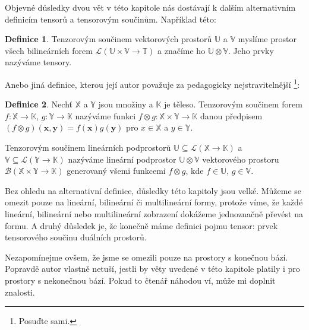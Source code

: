 \documentclass[a5paper,12pt]{amsbook}
\theoremstyle{definition}
\newtheorem{definition}{Definice}[chapter]
\newcommand{\myvec}[1]{\mathbf{#1}}
\newcommand{\myspace}[1]{\mathbb{#1}}
\begin{document}
\noindent
Objevné důsledky dvou vět v této kapitole nás dostávají k dalším alternativním definicím tensorů
a tensorovým součinům. Například této:

\begin{definition}
Tenzorovým součinem vektorových prostorů $\myspace{U}$ a $\myspace{V}$ myslíme prostor všech
bilineárních forem $\mathcal{L}(\myspace{U}\times\myspace{V}\rightarrow\myspace{T})$ a
značíme ho $\myspace{U}\otimes\myspace{V}$. Jeho prvky nazýváme tensory.
\end{definition}

Anebo jiná definice, kterou její autor považuje za pedagogicky nejstravitelnější
\footnote{Posuďte sami.}:

\begin{definition}
Nechť $\myspace{X}$ a $\myspace{Y}$ jsou množiny a $\myspace{K}$ je těleso. Tenzorovým součinem
forem $f: \myspace{X}\rightarrow\myspace{K}$, $g: \myspace{Y}\rightarrow\myspace{K}$ nazýváme
funkci $f\otimes g: \myspace{X}\times\myspace{Y}\rightarrow\myspace{K}$ danou předpisem
$(f\otimes g)(\myvec{x}, \myvec{y}) = f(\myvec{x})g(\myvec{y})$ pro $x\in \myspace{X}$ a $y\in\myspace{Y}$.

Tenzorovým součinem lineárních podprostorů
$\myspace{U}\subseteq\mathcal{L}(\myspace{X}\rightarrow\myspace{K})$
a $\myspace{V}\subseteq\mathcal{L}(\myspace{Y}\rightarrow\myspace{K})$ nazýváme lineární podprostor 
$\myspace{U}\otimes\myspace{V}$ vektorového prostoru
$\mathcal{B}(\myspace{X}\times\myspace{Y}\rightarrow\myspace{K})$
generovaný všemi funkcemi $f\otimes g$, kde $f\in\myspace{U}$, $g\in\myspace{V}$.
\end{definition}

\noindent
Bez ohledu na alternativní definice, důsledky této kapitoly jsou velké. Můžeme se omezit pouze
na lineární, bilineární či multilineární formy, protože víme, že každé lineární, bilineární
nebo multilineární zobrazení dokážeme jednoznačně převést na formu. A druhý důsledek je,
že konečně máme definici pojmu tensor: prvek tensorového součinu duálních
prostorů.

Nezapomínejme ovšem, že jsme se omezili pouze na prostory s konečnou bází. Popravdě
autor vlastně netuší, jestli by věty uvedené v této kapitole platily i pro prostory s nekonečnou
bází. Pokud to čtenář náhodou ví, může mi doplnit znalosti.
\end{document}
